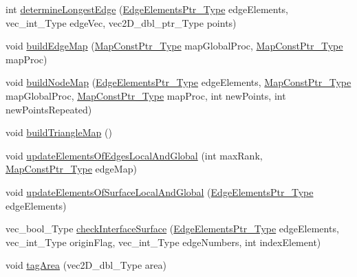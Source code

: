 \begin{DoxyCompactItemize}
\item 
int \hyperlink{classFEDD_1_1RefinementFactory_a383adbeffceada793b6805fb02fa5568}{determine\+Longest\+Edge} (\hyperlink{classFEDD_1_1RefinementFactory_ae5285e990ec4632d6188a1280627ad13}{Edge\+Elements\+Ptr\+\_\+\+Type} edge\+Elements, vec\+\_\+int\+\_\+\+Type edge\+Vec, vec2\+D\+\_\+dbl\+\_\+ptr\+\_\+\+Type points)
\item 
void \hyperlink{classFEDD_1_1RefinementFactory_a4294d0901e6691203b9043bb2f9c6ac6}{build\+Edge\+Map} (\hyperlink{classFEDD_1_1RefinementFactory_a8256ccdf1b2a5c977ddc011f4e8eb8d3}{Map\+Const\+Ptr\+\_\+\+Type} map\+Global\+Proc, \hyperlink{classFEDD_1_1RefinementFactory_a8256ccdf1b2a5c977ddc011f4e8eb8d3}{Map\+Const\+Ptr\+\_\+\+Type} map\+Proc)
\item 
void \hyperlink{classFEDD_1_1RefinementFactory_abeca9755a1bd393c36c792a78c6779e9}{build\+Node\+Map} (\hyperlink{classFEDD_1_1RefinementFactory_ae5285e990ec4632d6188a1280627ad13}{Edge\+Elements\+Ptr\+\_\+\+Type} edge\+Elements, \hyperlink{classFEDD_1_1RefinementFactory_a8256ccdf1b2a5c977ddc011f4e8eb8d3}{Map\+Const\+Ptr\+\_\+\+Type} map\+Global\+Proc, \hyperlink{classFEDD_1_1RefinementFactory_a8256ccdf1b2a5c977ddc011f4e8eb8d3}{Map\+Const\+Ptr\+\_\+\+Type} map\+Proc, int new\+Points, int new\+Points\+Repeated)
\item 
void \hyperlink{classFEDD_1_1RefinementFactory_a39c950be5d386f7a75f6d7392a9a2bc8}{build\+Triangle\+Map} ()
\item 
void \hyperlink{classFEDD_1_1RefinementFactory_a2ebf82a5deb92e26a48805fd470f6840}{update\+Elements\+Of\+Edges\+Local\+And\+Global} (int max\+Rank, \hyperlink{classFEDD_1_1RefinementFactory_a8256ccdf1b2a5c977ddc011f4e8eb8d3}{Map\+Const\+Ptr\+\_\+\+Type} edge\+Map)
\item 
void \hyperlink{classFEDD_1_1RefinementFactory_a8f295b405de2c056298b695bea51887b}{update\+Elements\+Of\+Surface\+Local\+And\+Global} (\hyperlink{classFEDD_1_1RefinementFactory_ae5285e990ec4632d6188a1280627ad13}{Edge\+Elements\+Ptr\+\_\+\+Type} edge\+Elements)
\item 
vec\+\_\+bool\+\_\+\+Type \hyperlink{classFEDD_1_1RefinementFactory_a97003a4445b40ac91728639de432a449}{check\+Interface\+Surface} (\hyperlink{classFEDD_1_1RefinementFactory_ae5285e990ec4632d6188a1280627ad13}{Edge\+Elements\+Ptr\+\_\+\+Type} edge\+Elements, vec\+\_\+int\+\_\+\+Type origin\+Flag, vec\+\_\+int\+\_\+\+Type edge\+Numbers, int index\+Element)
\item 
void \hyperlink{classFEDD_1_1RefinementFactory_a8f76b86ec161e405857e5c4a51aea968}{tag\+Area} (vec2\+D\+\_\+dbl\+\_\+\+Type area)

\end{DoxyCompactItemize}
